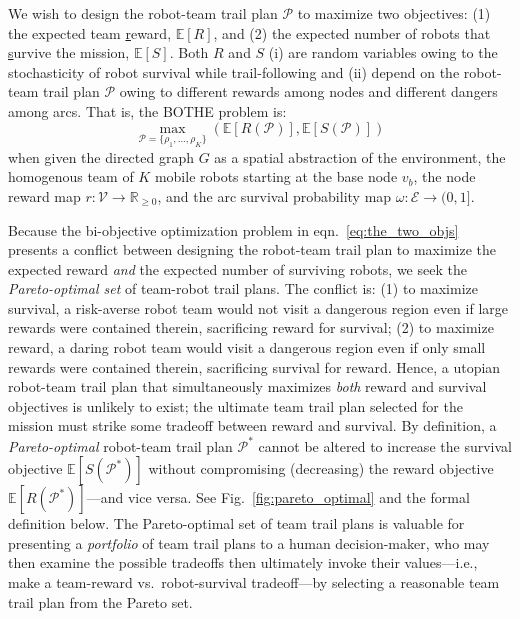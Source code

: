 \documentclass[fleqn,10pt,lineno]{wlpeerj}
\begin{document}
We wish to design the robot-team trail plan $\mathcal{P}$ to maximize two objectives: 
(1) the expected team \underline{r}eward, $\mathbb{E}[R]$, and (2) the expected number of robots that \underline{s}urvive the mission, $\mathbb{E}[S]$. Both $R$ and $S$ (i) are random variables owing to the stochasticity of robot survival while trail-following and (ii) depend on the robot-team trail plan $\mathcal{P}$ owing to different rewards among nodes and different dangers among arcs.
That is, the BOTHE problem is:
\begin{equation}
	\max_{\mathcal{P}=\{\rho_1, ..., \rho_K\}} \left( \mathbb{E}[R(\mathcal{P})], \mathbb{E}[S(\mathcal{P})] \right)
	\label{eq:the_two_objs}
\end{equation}
when given the directed graph $G$ as a spatial abstraction of the environment, 
the homogenous team of $K$ mobile robots starting at the base node $v_b$,
the node reward map $r: \mathcal{V} \rightarrow \mathbb{R}_{\geq 0}$, and the arc survival probability map $\omega : \mathcal{E} \rightarrow (0, 1]$.

Because the bi-objective optimization problem in eqn.~\ref{eq:the_two_objs} presents a conflict between designing the robot-team trail plan to maximize the expected reward \emph{and} the expected number of surviving robots, we seek the \emph{Pareto-optimal set} \cite{pardalos2017non,branke2008multiobjective} of team-robot trail plans. 
The conflict is: 
(1) to maximize survival, a risk-averse robot team would not visit a dangerous region even if large rewards were contained therein, sacrificing reward for survival; 
(2) to maximize reward, a daring robot team would visit a dangerous region even if only small rewards were contained therein, sacrificing survival for reward. 
Hence, a utopian robot-team trail plan that simultaneously maximizes \emph{both} reward and survival objectives is unlikely to exist; the ultimate team trail plan selected for the mission must strike some tradeoff between reward and survival.
By definition, a \emph{Pareto-optimal} \cite{pardalos2017non,branke2008multiobjective} robot-team trail plan $\mathcal{P}^*$ cannot be altered to increase the survival objective $\mathbb{E}[S(\mathcal{P}^*)]$ without compromising (decreasing) the reward objective $\mathbb{E}[R(\mathcal{P}^*)]$---and vice versa. See Fig.~\ref{fig:pareto_optimal} and the formal definition below.
The Pareto-optimal set of team trail plans is valuable for presenting a \emph{portfolio} of team trail plans to a human decision-maker, who may then examine the possible tradeoffs then ultimately invoke their values---i.e., make a team-reward vs.\  robot-survival tradeoff---by selecting a reasonable team trail plan from the Pareto set.
\end{document}
